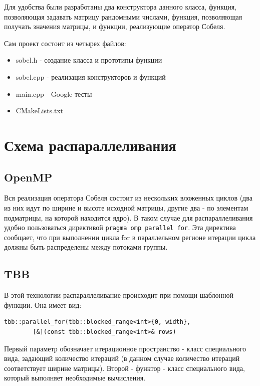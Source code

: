 \documentclass[14pt, a4paper]{extreport}
\begin{document}
Для удобства были разработаны два конструктора данного класса, функция, позволяющая задавать матрицу рандомными числами, функция, позволяющая получать значения матрицы, и функции, реализующие оператор Собеля.

Сам проект состоит из четырех файлов: 
\begin{itemize}
\item sobel.h - создание класса и прототипы функции
\item sobel.cpp - реализация конструкторов и функций
\item main.cpp - Google-тесты
\item CMakeLists.txt
\end{itemize}

\newpage 

\section*{Схема распараллеливания}

\subsection*{OpenMP}

Вся реализация оператора Собеля состоит из нескольких вложенных циклов (два из них идут по ширине и высоте исходной матрицы, другие два - по элементам подматрицы, на которой находится ядро). В таком случае для распараллеливания удобно пользоваться директивой \verb|pragma omp parallel for|. Эта директива сообщает, что при выполнении цикла for в параллельном регионе итерации цикла должны быть распределены между потоками группы.

\subsection*{TBB}

В этой технологии распараллеливание происходит при помощи шаблонной функции. Она имеет вид:
\begin{verbatim}
tbb::parallel_for(tbb::blocked_range<int>{0, width}, 
		[&](const tbb::blocked_range<int>& rows)
\end{verbatim}

Первый параметр обозначает итерационное пространство - класс специального вида, задающий количество итераций (в данном случае количество итераций соответствует ширине матрицы). Второй - функтор - класс специального вида, который выполняет необходимые вычисления.
\end{document}
